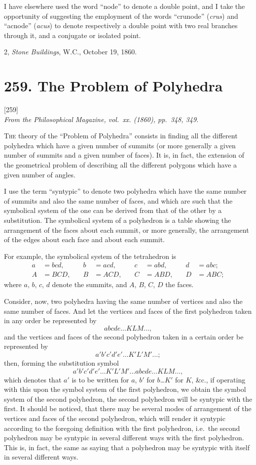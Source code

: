 \documentclass[11pt,a4paper]{article}
\theoremstyle{plain}
\theoremstyle{definition}
\newcommand{\paper}[4]{%
  \newpage
  \section*{#1. #2}
  \addcontentsline{toc}{section}{#1. #2}
  \begin{center}\small[#3]\\\textit{#4}\end{center}
  \vspace{1em}
}
\begin{document}
I have elsewhere used the word ``node'' to denote a double point, and I take the opportunity of suggesting the employment of the words ``crunode'' (\textit{crus}) and ``acnode'' (\textit{acus}) to denote respectively a double point with two real branches through it, and a conjugate or isolated point.

\begin{flushright}
2, \textit{Stone Buildings}, W.C., October 19, 1860.
\end{flushright}


\paper{259}{The Problem of Polyhedra}{259}{From the \textit{Philosophical Magazine}, vol.~xx. (1860), pp.~348, 349.}

\textsc{The} theory of the ``Problem of Polyhedra'' consists in finding all the different polyhedra which have a given number of summits (or more generally a given number of summits and a given number of faces). It is, in fact, the extension of the geometrical problem of describing all the different polygons which have a given number of angles.

I use the term ``syntypic'' to denote two polyhedra which have the same number of summits and also the same number of faces, and which are such that the symbolical system of the one can be derived from that of the other by a substitution. The symbolical system of a polyhedron is a table showing the arrangement of the faces about each summit, or more generally, the arrangement of the edges about each face and about each summit.

For example, the symbolical system of the tetrahedron is
\begin{align*}
a &= bcd, \quad& b &= acd, \quad& c &= abd, \quad& d &= abc; \\
A &= BCD, \quad& B &= ACD, \quad& C &= ABD, \quad& D &= ABC;
\end{align*}
where $a$, $b$, $c$, $d$ denote the summits, and $A$, $B$, $C$, $D$ the faces.

Consider, now, two polyhedra having the same number of vertices and also the same number of faces. And let the vertices and faces of the first polyhedron taken in any order be represented by
\[
abcde\ldots KLM\ldots,
\]
and the vertices and faces of the second polyhedron taken in a certain order be represented by
\[
a'b'c'd'e'\ldots K'L'M'\ldots;
\]
then, forming the substitution symbol
\[
a'b'c'd'e'\ldots K'L'M'\ldots abcde\ldots KLM\ldots,
\]
which denotes that $a'$ is to be written for $a$, $b'$ for $b$\ldots $K'$ for $K$, \&c., if operating with this upon the symbol system of the first polyhedron, we obtain the symbol system of the second polyhedron, the second polyhedron will be syntypic with the first. It should be noticed, that there may be several modes of arrangement of the vertices and faces of the second polyhedron, which will render it syntypic according to the foregoing definition with the first polyhedron, i.e.\ the second polyhedron may be syntypic in several different ways with the first polyhedron. This is, in fact, the same as saying that a polyhedron may be syntypic with itself in several different ways.
\end{document}
